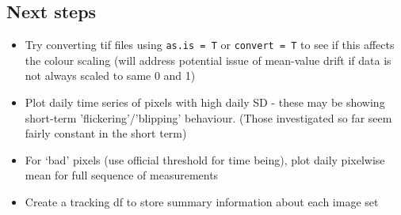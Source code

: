 \documentclass[10pt,fleqn]{article}
\begin{document}
\subsection*{Next steps}

\begin{itemize}

\item
Try converting tif files using \texttt{as.is = T} or \texttt{convert = T} to see if this affects the colour scaling (will address potential issue of mean-value drift if data is not always scaled to same 0 and 1)

\item
Plot daily time series of pixels with high daily SD - these may be showing short-term 'flickering'/'blipping' behaviour. (Those investigated so far seem fairly constant in the short term)

\item
For `bad' pixels (use official threshold for time being), plot daily pixelwise mean for full sequence of measurements

\item
Create a tracking df to store summary information about each image set

\end{itemize}

\end{document}
